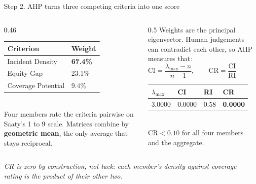 \documentclass[aspectratio=169,10pt]{beamer}
\newcommand{\caveat}[1]{{\footnotesize\color{inks}\textit{#1}}}
\begin{document}
\begin{frame}{Step 2. AHP turns three competing criteria into one score}
  \vspace{0.4em}
  \begin{columns}[T,onlytextwidth]
    \begin{column}{0.46\textwidth}
      {\footnotesize
      \begin{tabular}{@{}ll@{}}
        \toprule
        \textbf{Criterion} & \textbf{Weight} \\
        \midrule
        Incident Density    & \textbf{\color{s1}67.4\%} \\
        Equity Gap          & 23.1\% \\
        Coverage Potential  & \phantom{0}9.4\% \\
        \bottomrule
      \end{tabular}}\\[1.0em]
      {\footnotesize\color{inks}Four members rate the criteria pairwise on
      Saaty's 1 to 9 scale. Matrices combine by \textbf{geometric mean}, the
      only average that stays reciprocal.}
    \end{column}
    \begin{column}{0.5\textwidth}
      {\color{inks}Weights are the principal eigenvector. Human judgements
      can contradict each other, so AHP measures that:}\\[0.6em]
      \centering
      $\mathrm{CI}=\dfrac{\lambda_{\max}-n}{n-1}, \qquad
       \mathrm{CR}=\dfrac{\mathrm{CI}}{\mathrm{RI}}$\\[0.9em]
      \begin{tabular}{@{}llll@{}}
        \toprule
        $\lambda_{\max}$ & CI & RI & CR \\
        \midrule
        3.0000 & 0.0000 & 0.58 & \textbf{\color{good}0.0000} \\
        \bottomrule
      \end{tabular}\\[0.7em]
      {\footnotesize\color{good}$\mathrm{CR}<0.10$ for all four members and
      the aggregate.}
    \end{column}
  \end{columns}
  \vspace{0.6em}
  \caveat{CR is zero by construction, not luck: each member's
  density-against-coverage rating is the product of their other two.}
\end{frame}
\end{document}
